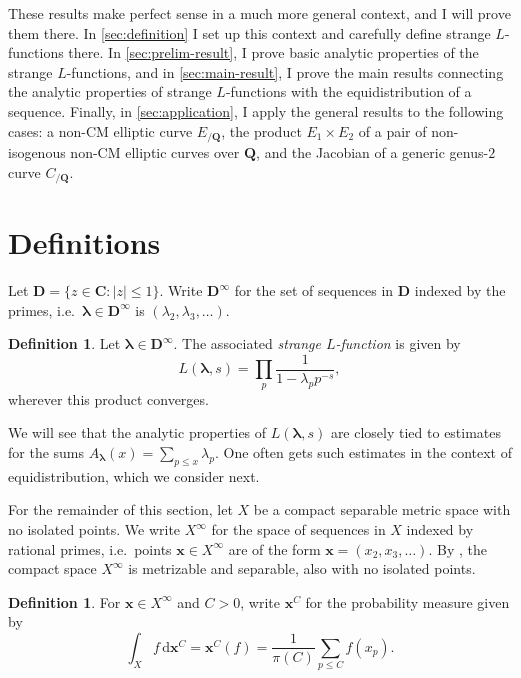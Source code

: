 \documentclass{article}
\newcommand{\bC}{\mathbf{C}}
\newcommand{\bD}{\mathbf{D}}
\newcommand{\blambda}{{\boldsymbol{\lambda}}}
\newcommand{\bQ}{\mathbf{Q}}
\newcommand{\bx}{\boldsymbol{x}}
\newcommand{\dd}{\mathrm{d}}
\theoremstyle{definition}
\newtheorem{definition}[subsection]{Definition}
\begin{document}
These results make perfect sense in a much more general context, and I will 
prove them there. In \autoref{sec:definition} I set up this context and 
carefully define strange $L$-functions there. In \autoref{sec:prelim-result}, I 
prove basic analytic properties of the strange $L$-functions, and in 
\autoref{sec:main-result}, I prove the main results connecting the analytic 
properties of strange $L$-functions with the equidistribution of a sequence. 
Finally, in \autoref{sec:application}, I apply the general results to the 
following cases: a non-CM elliptic curve $E_{/\bQ}$, the product 
$E_1\times E_2$ of a pair of non-isogenous non-CM elliptic curves over $\bQ$, 
and the Jacobian of a generic genus-$2$ curve $C_{/\bQ}$. 





\section{Definitions}\label{sec:definition}

Let $\bD=\{z\in \bC : |z|\leqslant 1\}$. Write $\bD^\infty$ for the set of 
sequences in $\bD$ indexed by the primes, i.e.~$\blambda\in\bD^\infty$ is 
$(\lambda_2,\lambda_3,\dots)$. 

\begin{definition}
Let $\blambda\in\bD^\infty$. The associated \emph{strange $L$-function} is 
given by 
\[
	L(\blambda,s) = \prod_p \frac{1}{1-\lambda_p p^{-s}} ,
\]
wherever this product converges. 
\end{definition}

We will see that the analytic properties of $L(\blambda,s)$ are closely tied to 
estimates for the sums $A_\blambda(x) = \sum_{p\leqslant x} \lambda_p$. One 
often gets such estimates in the context of equidistribution, which we consider 
next.

For the remainder of this section, let $X$ be a compact separable metric space with no 
isolated points. We write $X^\infty$ for the space of sequences in $X$ indexed 
by rational primes, i.e.~points $\bx\in X^\infty$ are of the form 
$\bx=(x_2,x_3,\dots)$. By \cite[Cor.~2.3.16 \& Th.~4.2.2]{engelking-1989}, the 
compact space $X^\infty$ is metrizable and separable, also with no isolated 
points. 

\begin{definition}
For $\bx\in X^\infty$ and $C>0$, write $\bx^C$ for the probability measure 
given by 
\[
	\int_X f\, \dd \bx^C = \bx^C(f) = \frac{1}{\pi(C)} \sum_{p\leqslant C} f(x_p) .
\]
\end{definition}
\end{document}
